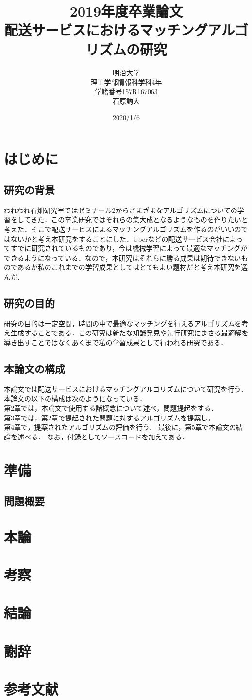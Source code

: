 \documentclass[10pt, a4paper, titlepage]{jarticle}
\title{2019年度卒業論文\\配送サービスにおけるマッチングアルゴリズムの研究}
\date{2020/1/6}
\author{明治大学\\理工学部情報科学科4年\\学籍番号157R167063\\石原詢大}
\begin{document}
\maketitle
\tableofcontents
\clearpage
\section{はじめに}
\subsection{研究の背景}
われわれ石畑研究室ではゼミナール2からさまざまなアルゴリズムについての学習をしてきた．この卒業研究ではそれらの集大成となるようなものを作りたいと考えた．そこで配送サービスによるマッチングアルゴリズムを作るのがいいのではないかと考え本研究をすることにした．Uberなどの配送サービス会社によってすでに研究されているものであり，今は機械学習によって最適なマッチングができるようになっている．なので，本研究はそれらに勝る成果は期待できないものであるが私のこれまでの学習成果としてはとてもよい題材だと考え本研究を選んだ．
\subsection{研究の目的}
研究の目的は一定空間，時間の中で最適なマッチングを行えるアルゴリズムを考え生成することである．この研究は新たな知識発見や先行研究にまさる最適解を導き出すことではなくあくまで私の学習成果として行われる研究である．
\subsection{本論文の構成}
本論文では配送サービスにおけるマッチングアルゴリズムについて研究を行う．\\
本論文の以下の構成は次のようになっている．\\
第2章では，本論文で使用する諸概念について述べ，問題提起をする．\\
第3章では，第2章で提起された問題に対するアルゴリズムを提案し，\\
第4章で，提案されたアルゴリズムの評価を行う．
最後に，第5章で本論文の結論を述べる．
なお，付録としてソースコードを加えてある．
\section{準備}
\subsection{問題概要}

\section{本論}
\section{考察}
\section{結論}
\section{謝辞}
\section{参考文献}
\end{document}
